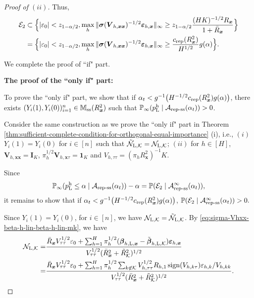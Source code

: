 \documentclass[12pt]{article}
\newcommand{\sign}{\operatorname{sign}}
\newcommand{\sss}{\textnormal{ss}}
\newcommand{\Lin}{\textnormal{L}}
\newcommand{\Prob}{\mathbb{P}}
\newcommand{\mk}{\mathcal{K}}
\newcommand{\ma}{\mathcal{A}}
\newcommand{\repss}{\textnormal{rep-ss}}
\newcommand{\rep}{\textnormal{rep}}
\newcommand{\bs}{\boldsymbol}
\newcommand{\vtt}{V_{\tau\tau}}
\newcommand{\hpL}{p_\textnormal{L}^{\textnormal{h}}}
\begin{document}
\begin{proof}[Proof of  $(ii)$]
   Thus, 
\begin{align*}
\mathcal{E}_2  &\subset \Big\{|\varepsilon_0| < z_{1-\alpha/2},\max_h \|\bs{\sigma}(\bs{V}_{h,\bs{x}\bs{x}})^{-1/2}\bs{\varepsilon}_{h,\bs{x}}\|_\infty \geq z_{1-\alpha/2}\frac{(HK)^{-1/2}R_{\bs{x}}}{1+\bar{R}_{\bs{x}}}\Big\}\\
&=\Big\{|\varepsilon_0| < z_{1-\alpha/2},\max_h \|\bs{\sigma}(\bs{V}_{h,\bs{x}\bs{x}})^{-1/2}\bs{\varepsilon}_{h,\bs{x}}\|_\infty \geq \frac{c_{\rep}(R_{\bs{x}}^2)}{H^{1/2}}g(\alpha)\Big\}.  
\end{align*}

We complete the proof of ``if" part.

\noindent \textbf{The proof of the ``only if" part:}

To prove the ``only if" part, we show that if $\alpha_t < g^{-1}\big(H^{-1/2}c_{\rep}(R^2_{\bs{x}} )g(\alpha)\big)$, there exists $(Y_i(1),Y_i(0))_{i=1}^n \in \mathbb{M}_{\sss}(R^2_{\bs{x}})$ such that $\Prob_{\infty}(\hpL\mid \ma_{\repss}(\alpha_t)) > 0$.

Consider the same construction as we prove the ``only if" part in Theorem \ref{thm:sufficient-complete-condition-for-orthogonal-equal-importance} (i), i.e.,
$(i)$ $Y_i(1) = Y_i(0)$ for $i \in [n]$ such that $\tilde{\mathcal{N}}_{\Lin,\mk} = \mathcal{N}_{\Lin, \mk}$; $(ii)$  for $h \in [H]$, $\bs{V}_{h, \bs{x}\bs{x}} = \bs{I}_{K}$, $\pi_{h}^{1/2}\bs{V}_{h, \bs{x}\tau} = \bs{1}_{K}$ and $V_{h,\tau\tau} = (\pi_{h}R^2_{\bs{x}})^{-1}K$. 

Since
\begin{align*}
\Prob_{\infty}(\hpL \leq \alpha \mid \mathcal{A}_{\repss}(\alpha_t))-\alpha = \Prob(\mathcal{E}_2\mid\mathcal{A}_{\repss}^{\infty}(\alpha_t)),
\end{align*}
it remains to show that if $\alpha_t < g^{-1}\big(H^{-1/2}c_{\rep}(R^2_{\bs{x}} )g(\alpha)\big)$, $\Prob(\mathcal{E}_2\mid\mathcal{A}_{\repss}^{\infty}(\alpha_t)) > 0.$

Since $Y_i(1)=Y_i(0)$, for $i \in [n]$, we have $\mathcal{N}_{\Lin, \mk} = \tilde{\mathcal{N}}_{\Lin, \mk}$.  By \eqref{eq:sigma-Vhxx-beta-h-lin-beta-h-lin-mk}, we have
\begin{align*}
    \mathcal{N}_{\Lin, \mk} =& \frac{\bar{R}_{\bs{x}}\vtt^{1/2}\varepsilon_0+\sum_{h=1}^H \pi_{h}^{1/2} (\bs{\beta}_{h, \Lin , \bs{x}}-\tilde{\bs{\beta}}_{h,\Lin,\mk})\bs{\varepsilon}_{h,\bs{x}}}{\vtt^{1/2}(\bar{R}_{\bs{x}}^2 + \tilde{R}^2_{\mk})^{1/2}}\\
    =& \frac{\bar{R}_{\bs{x}}\vtt^{1/2}\varepsilon_0+\sum_{h=1}^H \pi_{h}^{1/2} \sum_{k\not\in \mk}V_{h,\tau\tau}^{1/2}R_{h,1}\sign(V_{h,k \tau})\varepsilon_{h,k}/V_{h,kk}}{\vtt^{1/2}(\bar{R}_{\bs{x}}^2 + \tilde{R}^2_{\mk})^{1/2}}.
\end{align*}


\end{proof}
\end{document}
